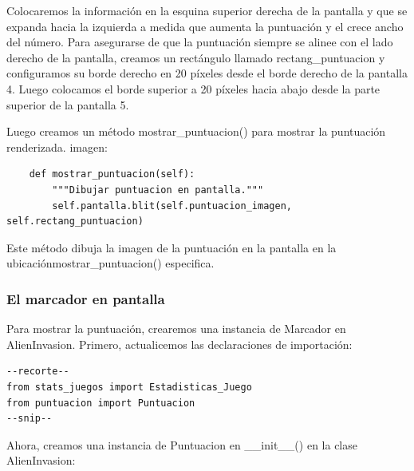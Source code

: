 Colocaremos la información  en la esquina superior derecha de la pantalla y  que se expanda hacia la izquierda a medida que aumenta la puntuación y el crece ancho del número. 
Para asegurarse de que la puntuación siempre se alinee con el lado derecho de
la pantalla, creamos un {\ttfamily rectángulo} llamado {\ttfamily rectang\_puntuacion} y configuramos su borde derecho en 20 píxeles
desde el borde derecho de la pantalla 4. Luego colocamos el borde superior a 20 píxeles
hacia abajo desde la parte superior de la pantalla 5.

Luego creamos un método {\ttfamily mostrar\_puntuacion()} para mostrar la puntuación  renderizada.
imagen:

\hspace{-2.9cm}{\ttfamily \scriptsize puntuacion.py}  \vspace{-0.5cm}
\begin{lstlisting}
    def mostrar_puntuacion(self):
        """Dibujar puntuacion en pantalla."""
        self.pantalla.blit(self.puntuacion_imagen, self.rectang_puntuacion)
\end{lstlisting}

Este método dibuja la imagen de la puntuación en la pantalla en la ubicación{\ttfamily mostrar\_puntuacion()}
especifica.

\subsubsection{El marcador en pantalla}

Para mostrar la puntuación, crearemos una instancia de Marcador en {\ttfamily AlienInvasion}. Primero,
actualicemos las declaraciones de importación:

\hspace{-2.4cm}{\ttfamily \scriptsize invasión}

\vspace{-0.2cm}
\hspace{-2.1cm}{\ttfamily \scriptsize \_alien.py}\vspace{-0.84cm}
\begin{lstlisting}		
--recorte--
from stats_juegos import Estadisticas_Juego
from puntuacion import Puntuacion
--snip--
\end{lstlisting}

 

Ahora, creamos una instancia de {\ttfamily Puntuacion} en {\ttfamily \_\_init\_\_()} en la clase {\ttfamily AlienInvasion}:



